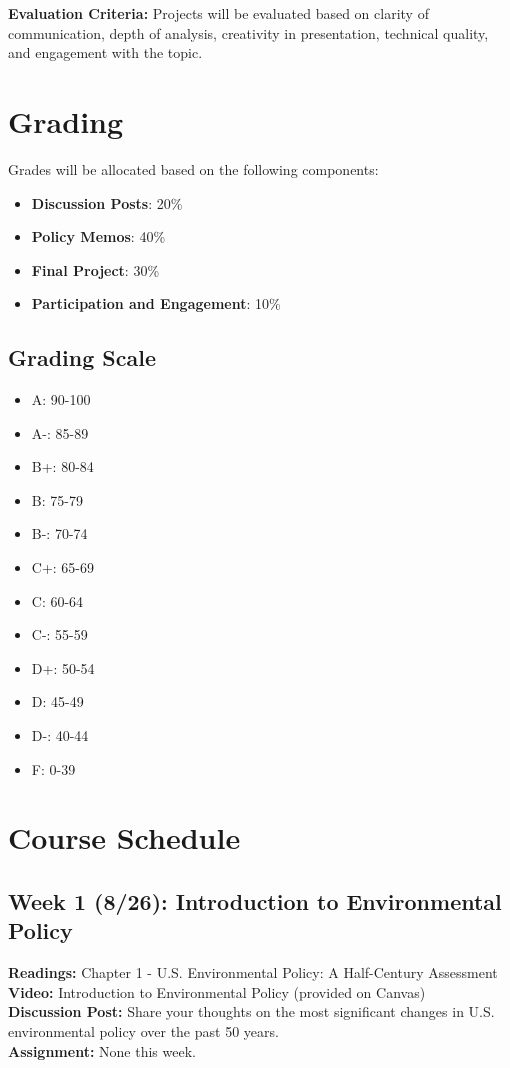 \documentclass[12pt, letterpaper]{article}
\begin{document}
\textbf{Evaluation Criteria:} Projects will be evaluated based on clarity of communication, depth of analysis, creativity in presentation, technical quality, and engagement with the topic.

\section*{Grading}
Grades will be allocated based on the following components:
\begin{itemize}
    \item \textbf{Discussion Posts}: 20\%
    \item \textbf{Policy Memos}: 40\%
    \item \textbf{Final Project}: 30\%
    \item \textbf{Participation and Engagement}: 10\%
\end{itemize}

\subsection*{Grading Scale}

\begin{itemize}
    \item A: 90-100
    \item A-: 85-89
    \item B+: 80-84
    \item B: 75-79
    \item B-: 70-74
    \item C+: 65-69
    \item C: 60-64
    \item C-: 55-59
    \item D+: 50-54
    \item D: 45-49
    \item D-: 40-44
    \item F: 0-39
\end{itemize}


\section*{Course Schedule}

\subsection*{Week 1 (8/26): Introduction to Environmental Policy}
\textbf{Readings:} Chapter 1 - U.S. Environmental Policy: A Half-Century Assessment\\
\textbf{Video:} Introduction to Environmental Policy (provided on Canvas)\\
\textbf{Discussion Post:} Share your thoughts on the most significant changes in U.S. environmental policy over the past 50 years.\\
\textbf{Assignment:} None this week.
\end{document}
